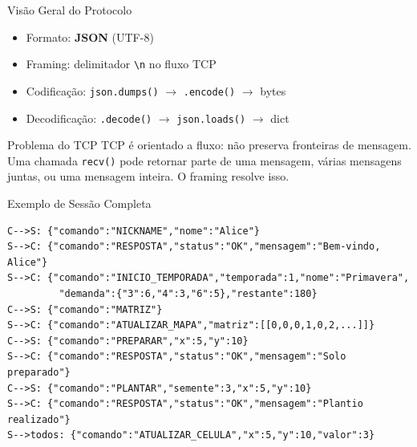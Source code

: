 \documentclass[aspectratio=169]{beamer}
\begin{document}
\begin{frame}{Vis\~ao Geral do Protocolo}
  \begin{itemize}
    \item Formato: \textbf{JSON} (UTF-8)
    \item Framing: delimitador \texttt{\textbackslash n} no fluxo TCP
    \item Codifica\c{c}\~ao: \texttt{json.dumps()} $\rightarrow$ \texttt{.encode()} $\rightarrow$ bytes
    \item Decodifica\c{c}\~ao: \texttt{.decode()} $\rightarrow$ \texttt{json.loads()} $\rightarrow$ dict
  \end{itemize}
  \vfill
  \begin{block}{Problema do TCP}
    TCP \'e orientado a fluxo: n\~ao preserva fronteiras de mensagem. Uma chamada \texttt{recv()} pode retornar parte de uma mensagem, v\'arias mensagens juntas, ou uma mensagem inteira. O framing resolve isso.
  \end{block}
\end{frame}

\begin{frame}[fragile]{Exemplo de Sess\~ao Completa}
\begin{lstlisting}[style=json, basicstyle=\ttfamily\scriptsize]
C-->S: {"comando":"NICKNAME","nome":"Alice"}
S-->C: {"comando":"RESPOSTA","status":"OK","mensagem":"Bem-vindo, Alice"}
S-->C: {"comando":"INICIO_TEMPORADA","temporada":1,"nome":"Primavera",
         "demanda":{"3":6,"4":3,"6":5},"restante":180}
C-->S: {"comando":"MATRIZ"}
S-->C: {"comando":"ATUALIZAR_MAPA","matriz":[[0,0,0,1,0,2,...]]}
C-->S: {"comando":"PREPARAR","x":5,"y":10}
S-->C: {"comando":"RESPOSTA","status":"OK","mensagem":"Solo preparado"}
C-->S: {"comando":"PLANTAR","semente":3,"x":5,"y":10}
S-->C: {"comando":"RESPOSTA","status":"OK","mensagem":"Plantio realizado"}
S-->todos: {"comando":"ATUALIZAR_CELULA","x":5,"y":10,"valor":3}
\end{lstlisting}
\end{frame}
\end{document}
